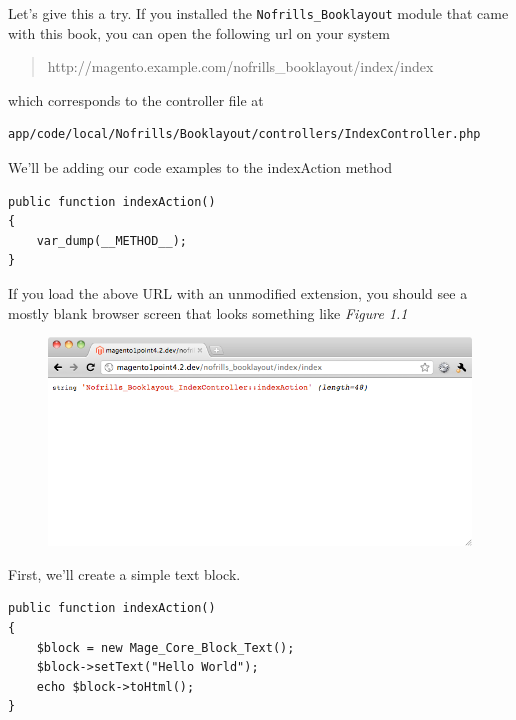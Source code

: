 \documentclass[oneside]{book}
\begin{document}
Let's give this a try. If you installed the \footnotesize\texttt{Nofrills\_Booklayout} \normalsize  module that came with this book, you can open the following url on your system

\begin{quote}
http://magento.example.com/nofrills\_booklayout/index/index
\end{quote}

which corresponds to the controller file at

\begin{lstlisting}
app/code/local/Nofrills/Booklayout/controllers/IndexController.php

\end{lstlisting}


We'll be adding our code examples to the indexAction method

\begin{lstlisting}
public function indexAction()
{
    var_dump(__METHOD__);
}

\end{lstlisting}


If you load the above URL with an unmodified extension, you should see a mostly blank browser screen that looks something like \emph{Figure 1.1}

\begin{figure}[htb]
\begin{center}
\leavevmode
\includegraphics[width=1\textwidth]{images/chapter1/start.png}
\end{center}
\caption{}
\end{figure}


First, we'll create a simple text block.

\begin{lstlisting}
public function indexAction()
{
    $block = new Mage_Core_Block_Text();
    $block->setText("Hello World");
    echo $block->toHtml();  
}

\end{lstlisting}
\end{document}
